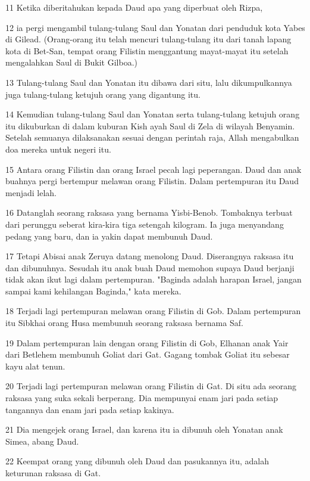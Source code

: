 \par 11 Ketika diberitahukan kepada Daud apa yang diperbuat oleh Rizpa,
\par 12 ia pergi mengambil tulang-tulang Saul dan Yonatan dari penduduk kota Yabes di Gilead. (Orang-orang itu telah mencuri tulang-tulang itu dari tanah lapang kota di Bet-San, tempat orang Filistin menggantung mayat-mayat itu setelah mengalahkan Saul di Bukit Gilboa.)
\par 13 Tulang-tulang Saul dan Yonatan itu dibawa dari situ, lalu dikumpulkannya juga tulang-tulang ketujuh orang yang digantung itu.
\par 14 Kemudian tulang-tulang Saul dan Yonatan serta tulang-tulang ketujuh orang itu dikuburkan di dalam kuburan Kish ayah Saul di Zela di wilayah Benyamin. Setelah semuanya dilaksanakan sesuai dengan perintah raja, Allah mengabulkan doa mereka untuk negeri itu.
\par 15 Antara orang Filistin dan orang Israel pecah lagi peperangan. Daud dan anak buahnya pergi bertempur melawan orang Filistin. Dalam pertempuran itu Daud menjadi lelah.
\par 16 Datanglah seorang raksasa yang bernama Yisbi-Benob. Tombaknya terbuat dari perunggu seberat kira-kira tiga setengah kilogram. Ia juga menyandang pedang yang baru, dan ia yakin dapat membunuh Daud.
\par 17 Tetapi Abisai anak Zeruya datang menolong Daud. Diserangnya raksasa itu dan dibunuhnya. Sesudah itu anak buah Daud memohon supaya Daud berjanji tidak akan ikut lagi dalam pertempuran. "Baginda adalah harapan Israel, jangan sampai kami kehilangan Baginda," kata mereka.
\par 18 Terjadi lagi pertempuran melawan orang Filistin di Gob. Dalam pertempuran itu Sibkhai orang Husa membunuh seorang raksasa bernama Saf.
\par 19 Dalam pertempuran lain dengan orang Filistin di Gob, Elhanan anak Yair dari Betlehem membunuh Goliat dari Gat. Gagang tombak Goliat itu sebesar kayu alat tenun.
\par 20 Terjadi lagi pertempuran melawan orang Filistin di Gat. Di situ ada seorang raksasa yang suka sekali berperang. Dia mempunyai enam jari pada setiap tangannya dan enam jari pada setiap kakinya.
\par 21 Dia mengejek orang Israel, dan karena itu ia dibunuh oleh Yonatan anak Simea, abang Daud.
\par 22 Keempat orang yang dibunuh oleh Daud dan pasukannya itu, adalah keturunan raksasa di Gat.

